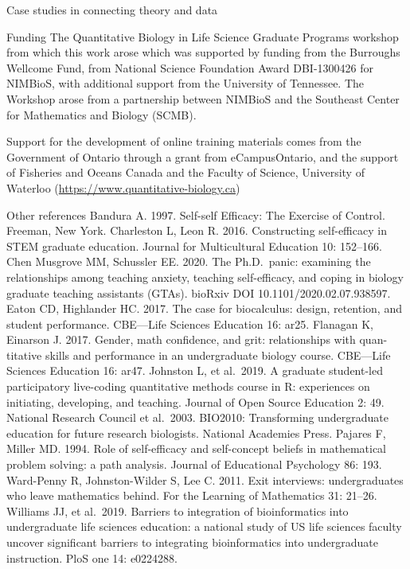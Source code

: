 \documentclass[
  ignorenonframetext,
]{beamer}
\begin{document}
\begin{frame}{Case studies in connecting theory and data}
\begin{block}{Funding}
\protect\hypertarget{funding}{}
The Quantitative Biology in Life Science Graduate Programs workshop from
which this work arose which was supported by funding from the Burroughs
Wellcome Fund, from National Science Foundation Award DBI-1300426 for
NIMBioS, with additional support from the University of Tennessee. The
Workshop arose from a partnership between NIMBioS and the Southeast
Center for Mathematics and Biology (SCMB).

Support for the development of online training materials comes from the
Government of Ontario through a grant from eCampusOntario, and the
support of Fisheries and Oceans Canada and the Faculty of Science,
University of Waterloo (\url{https://www.quantitative-biology.ca})
\end{block}

\begin{block}{Other references}
\protect\hypertarget{other-references}{}
Bandura A. 1997. Self-self Efficacy: The Exercise of Control. Freeman,
New York. Charleston L, Leon R. 2016. Constructing self-efficacy in STEM
graduate education. Journal for Multicultural Education 10: 152--166.
Chen Musgrove MM, Schussler EE. 2020. The Ph.D.~panic: examining the
relationships among teaching anxiety, teaching self-efficacy, and coping
in biology graduate teaching assistants (GTAs). bioRxiv DOI
10.1101/2020.02.07.938597. Eaton CD, Highlander HC. 2017. The case for
biocalculus: design, retention, and student performance. CBE---Life
Sciences Education 16: ar25. Flanagan K, Einarson J. 2017. Gender, math
confidence, and grit: relationships with quan- titative skills and
performance in an undergraduate biology course. CBE---Life Sciences
Education 16: ar47. Johnston L, et al.~2019. A graduate student-led
participatory live-coding quantitative methods course in R: experiences
on initiating, developing, and teaching. Journal of Open Source
Education 2: 49. National Research Council et al.~2003. BIO2010:
Transforming undergraduate education for future research biologists.
National Academies Press. Pajares F, Miller MD. 1994. Role of
self-efficacy and self-concept beliefs in mathematical problem solving:
a path analysis. Journal of Educational Psychology 86: 193. Ward-Penny
R, Johnston-Wilder S, Lee C. 2011. Exit interviews: undergraduates who
leave mathematics behind. For the Learning of Mathematics 31: 21--26.
Williams JJ, et al.~2019. Barriers to integration of bioinformatics into
undergraduate life sciences education: a national study of US life
sciences faculty uncover significant barriers to integrating
bioinformatics into undergraduate instruction. PloS one 14: e0224288.
\end{block}


\end{frame}
\end{document}
